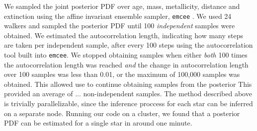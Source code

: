 We sampled the joint posterior PDF over age, mass, metallicity, distance and
extinction using the affine invariant ensemble sampler, {\tt emcee}
\citep{foreman-mackey2013}.
We used 24 walkers and sampled the posterior PDF until 100 {\it independent}
samples were obtained.
We estimated the autocorrelation length, indicating how many steps are taken
per independent sample, after every 100 steps using the autocorrelation tool
built into {\tt emcee}.
We stopped obtaining samples when either {\it both} 100 times the
autocorrelation length was reached {\it and} the change in autocorrelation
length over 100 samples was less than 0.01, or the maximum of 100,000 samples
was obtained.
This allowed use to continue obtaining samples from the posterior
This provided an average of ... non-independent samples.
The method described above is trivially parallelizable, since the
inference proccess for each star can be inferred on a separate node.
Running our code on a cluster, we found that a posterior PDF can be estimated
for a single star in around one minute.
